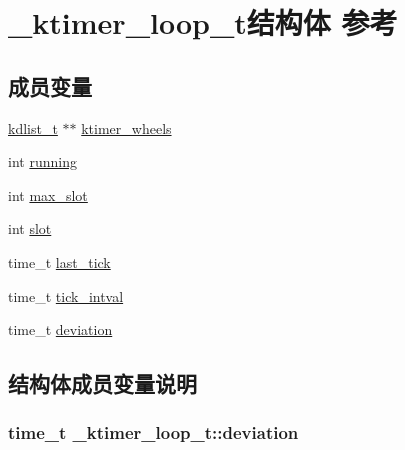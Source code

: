 \hypertarget{a00025}{}\section{\+\_\+ktimer\+\_\+loop\+\_\+t结构体 参考}
\label{a00025}
\subsection*{成员变量}
\begin{DoxyCompactItemize}
\item 
\hyperlink{a00056_ae098586334a621a23cef7cb17590b618_ae098586334a621a23cef7cb17590b618}{kdlist\+\_\+t} $\ast$$\ast$ \hyperlink{a00025_af46eedea07362213535dabc815b74c92_af46eedea07362213535dabc815b74c92}{ktimer\+\_\+wheels}
\item 
int \hyperlink{a00025_aab0b79491b93f3752c93dfb1d8c60e66_aab0b79491b93f3752c93dfb1d8c60e66}{running}
\item 
int \hyperlink{a00025_aeb8772fdff5de87ce1db9878f1357043_aeb8772fdff5de87ce1db9878f1357043}{max\+\_\+slot}
\item 
int \hyperlink{a00025_ae54f1df7a355b968dcc9baf7dca10a8d_ae54f1df7a355b968dcc9baf7dca10a8d}{slot}
\item 
time\+\_\+t \hyperlink{a00025_aa0cf5e5f3b5532aa4335d25831c9d2c3_aa0cf5e5f3b5532aa4335d25831c9d2c3}{last\+\_\+tick}
\item 
time\+\_\+t \hyperlink{a00025_a5bfbb75720e6a5310417980347763c82_a5bfbb75720e6a5310417980347763c82}{tick\+\_\+intval}
\item 
time\+\_\+t \hyperlink{a00025_a868b5369122bc5b595427a8c060249fc_a868b5369122bc5b595427a8c060249fc}{deviation}
\end{DoxyCompactItemize}


\subsection{结构体成员变量说明}
\hypertarget{a00025_a868b5369122bc5b595427a8c060249fc_a868b5369122bc5b595427a8c060249fc}{}
\subsubsection[{deviation}]{\setlength{\rightskip}{0pt plus 5cm}time\+\_\+t \+\_\+ktimer\+\_\+loop\+\_\+t\+::deviation}\label{a00025_a868b5369122bc5b595427a8c060249fc_a868b5369122bc5b595427a8c060249fc}
\hypertarget{a00025_af46eedea07362213535dabc815b74c92_af46eedea07362213535dabc815b74c92}{}
